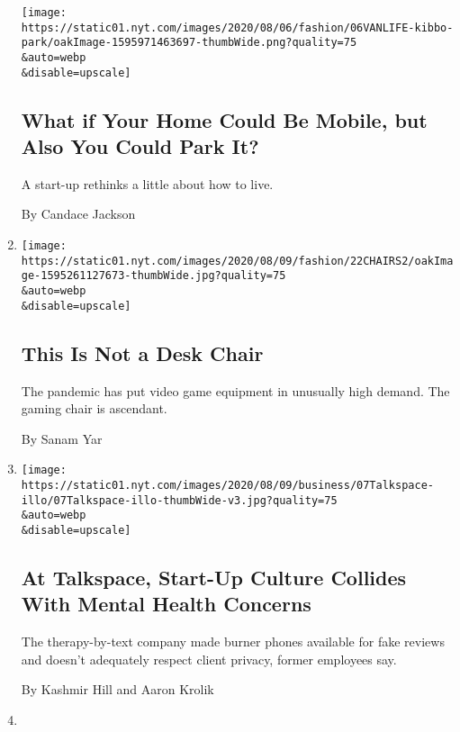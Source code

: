 \begin{enumerate}
  \texttt{[image: https://static01.nyt.com/images/2020/08/06/fashion/06VANLIFE-kibbo-park/oakImage-1595971463697-thumbWide.png?quality=75\\\&auto=webp\\\&disable=upscale]}

  \hypertarget{what-if-your-home-could-be-mobile-but-also-you-could-park-it}{%
  \subsection{What if Your Home Could Be Mobile, but Also You Could Park
  It?}\label{what-if-your-home-could-be-mobile-but-also-you-could-park-it}}

  A start-up rethinks a little about how to live.

  By Candace Jackson
\item
  \href{/2020/08/07/style/gamer-chair-market-herman-miller.html}{}

  \texttt{[image: https://static01.nyt.com/images/2020/08/09/fashion/22CHAIRS2/oakImage-1595261127673-thumbWide.jpg?quality=75\\\&auto=webp\\\&disable=upscale]}

  \hypertarget{this-is-not-a-desk-chair}{%
  \subsection{This Is Not a Desk Chair}\label{this-is-not-a-desk-chair}}

  The pandemic has put video game equipment in unusually high demand.
  The gaming chair is ascendant.

  By Sanam Yar
\item
  \href{/2020/08/07/technology/talkspace.html}{}

  \texttt{[image: https://static01.nyt.com/images/2020/08/09/business/07Talkspace-illo/07Talkspace-illo-thumbWide-v3.jpg?quality=75\\\&auto=webp\\\&disable=upscale]}

  \hypertarget{at-talkspace-start-up-culture-collides-with-mental-health-concerns}{%
  \subsection{At Talkspace, Start-Up Culture Collides With Mental Health
  Concerns}\label{at-talkspace-start-up-culture-collides-with-mental-health-concerns}}

  The therapy-by-text company made burner phones available for fake
  reviews and doesn't adequately respect client privacy, former
  employees say.

  By Kashmir Hill and Aaron Krolik
\item
  \href{/2020/08/06/technology/uber-ride-hailing-delivery-coronavirus.html}{}


\end{enumerate}
